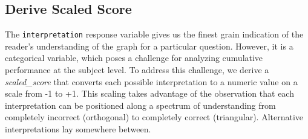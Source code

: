 \documentclass[
  letterpaper,
  DIV=11,
  numbers=noendperiod]{scrreprt}
\newenvironment{Shaded}{\begin{snugshade}}{\end{snugshade}}
\newcommand{\AttributeTok}[1]{\textcolor[rgb]{0.40,0.45,0.13}{#1}}
\newcommand{\CommentTok}[1]{\textcolor[rgb]{0.37,0.37,0.37}{#1}}
\newcommand{\FunctionTok}[1]{\textcolor[rgb]{0.28,0.35,0.67}{#1}}
\newcommand{\NormalTok}[1]{\textcolor[rgb]{0.00,0.23,0.31}{#1}}
\newcommand{\OtherTok}[1]{\textcolor[rgb]{0.00,0.23,0.31}{#1}}
\newcommand{\SpecialCharTok}[1]{\textcolor[rgb]{0.37,0.37,0.37}{#1}}
\newcommand{\StringTok}[1]{\textcolor[rgb]{0.13,0.47,0.30}{#1}}
\begin{document}
\begin{Shaded}
\end{Shaded}

\hypertarget{sec-SGC3A-scaledScore}{%
\subsection{Derive Scaled Score}\label{sec-SGC3A-scaledScore}}

The \texttt{interpretation} response variable gives us the finest grain
indication of the reader's understanding of the graph for a particular
question. However, it is a categorical variable, which poses a challenge
for analyzing cumulative performance at the subject level. To address
this challenge, we derive a \emph{scaled\_score} that converts each
possible interpretation to a numeric value on a scale from -1 to +1.
This scaling takes advantage of the observation that each interpretation
can be positioned along a spectrum of understanding from completely
incorrect (orthogonal) to completely correct (triangular). Alternative
interpretations lay somewhere between.
\end{document}
